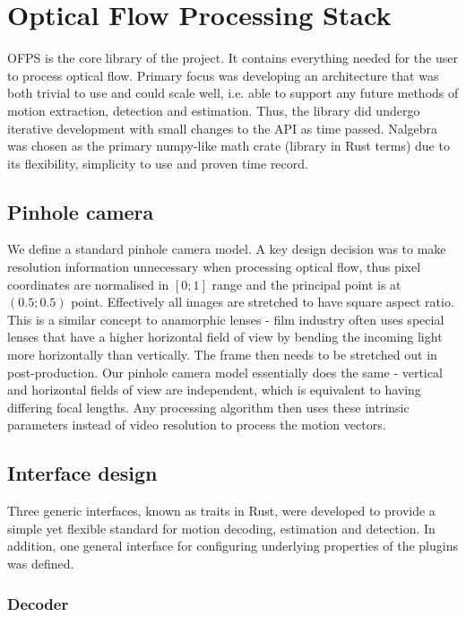 \documentclass[11pt,english]{report}
\begin{document}
\section{Optical Flow Processing Stack}

OFPS is the core library of the project. It contains everything needed for the user to process optical flow. Primary focus was developing an architecture that was both trivial to use and could scale well, i.e. able to support any future methods of motion extraction, detection and estimation. Thus, the library did undergo iterative development with small changes to the API as time passed. Nalgebra was chosen as the primary numpy-like math crate (library in Rust terms) due to its flexibility, simplicity to use and proven time record.

\subsection{Pinhole camera}

We define a standard pinhole camera model. A key design decision was to make resolution information unnecessary when processing optical flow, thus pixel coordinates are normalised in $[0; 1]$ range and the principal point is at $(0.5; 0.5)$ point. Effectively all images are stretched to have square aspect ratio. This is a similar concept to anamorphic lenses - film industry often uses special lenses that have a higher horizontal field of view by bending the incoming light more horizontally than vertically. The frame then needs to be stretched out in post-production. Our pinhole camera model essentially does the same - vertical and horizontal fields of view are independent, which is equivalent to having differing focal lengths. Any processing algorithm then uses these intrinsic parameters instead of video resolution to process the motion vectors.

\subsection{Interface design}

Three generic interfaces, known as traits in Rust, were developed to provide a simple yet flexible standard for motion decoding, estimation and detection. In addition, one general interface for configuring underlying properties of the plugins was defined.

\subsubsection{Decoder}
\end{document}
